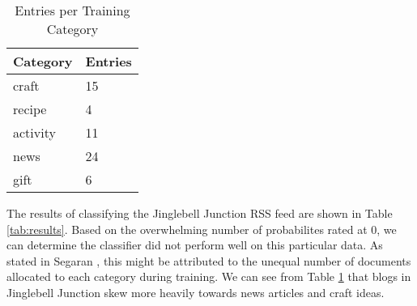 \documentclass[letterpaper,11pt]{report}
\begin{document}
\begin{savenotes}
\begin{table}[htbp]
	\centering
    \begin{tabular}{|p{4cm}|l|}
    \hline
    Category & Entries \\ \hline
    craft    & 15    \\ \hline
    recipe   & 4     \\ \hline
    activity & 11    \\ \hline
    news     & 24    \\ \hline
    gift     & 6     \\ \hline
    \end{tabular}
    \caption {Entries per Training Category}
			\label{tab:training}
\end{table}

The results of classifying the Jinglebell Junction RSS feed are shown in Table \ref{tab:results}. Based on the overwhelming number of probabilites rated at 0, we can determine the classifier did not perform well on this particular data. As stated in Segaran \cite{segaran2007programming}, this might be attributed to the unequal number of documents allocated to each category during training. We can see from Table \ref{tab:training} that blogs in Jinglebell Junction skew more heavily towards news articles and craft ideas.


\end{savenotes}
\end{document}
